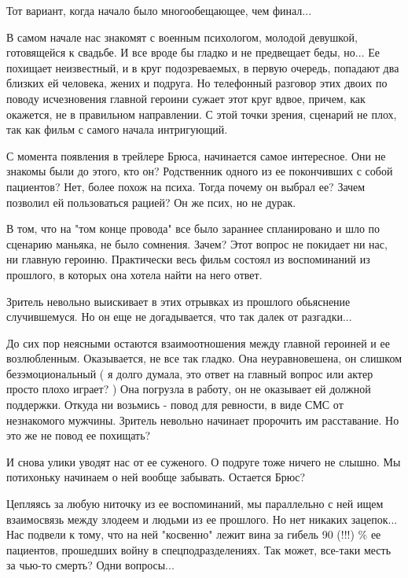  
 
 
 
 

Тот вариант, когда начало было многообещающее, чем финал...

В самом начале нас знакомят с военным психологом, молодой девушкой, готовящейся
к свадьбе. И все вроде бы гладко и не предвещает беды, но... Ее похищает
неизвестный, и в круг подозреваемых, в первую очередь, попадают два близких ей
человека, жених и подруга. Но телефонный разговор этих двоих по поводу
исчезновения главной героини сужает этот круг вдвое, причем, как окажется, не в
правильном направлении. С этой точки зрения, сценарий не плох, так как фильм с
самого начала интригующий.

С момента появления в трейлере Брюса, начинается самое интересное. Они не
знакомы были до этого, кто он? Родственник одного из ее покончивших с собой
пациентов? Нет, более похож на психа. Тогда почему он выбрал ее? Зачем позволил
ей пользоваться рацией? Он же псих, но не дурак.

В том, что на "том конце провода" все было зараннее спланировано и шло по
сценарию маньяка, не было сомнения. Зачем? Этот вопрос не покидает ни нас, ни
главную героиню. Практически весь фильм состоял из воспоминаний из прошлого, в
которых она хотела найти на него ответ.

Зритель невольно выискивает в этих отрывках из прошлого обьяснение
случившемуся.  Но он еще не догадывается, что так далек от разгадки...

До сих пор неясными остаются взаимоотношения между главной героиней и ее
возлюбленным.  Оказывается, не все так гладко. Она неуравновешена, он слишком
безэмоциональный ( я долго думала, это ответ на главный вопрос или актер просто
плохо играет? ) Она погрузла в работу, он не оказывает ей должной поддержки.
Откуда ни возьмись - повод для ревности, в виде СМС от незнакомого мужчины.
Зритель невольно начинает пророчить им расставание. Но это же не повод ее
похищать?

И снова улики уводят нас от ее суженого. О подруге тоже ничего не слышно.  Мы
потихоньку начинаем о ней вообще забывать. Остается Брюс?

Цепляясь за любую ниточку из ее воспоминаний, мы параллельно с ней ищем
взаимосвязь между злодеем и людьми из ее прошлого. Но нет никаких зацепок...
Нас подвели к тому, что на ней "косвенно" лежит вина за гибель 90 (!!!) \% ее
пациентов, прошедших войну в спецподразделениях. Так может, все-таки месть за
чью-то смерть? Одни вопросы...

